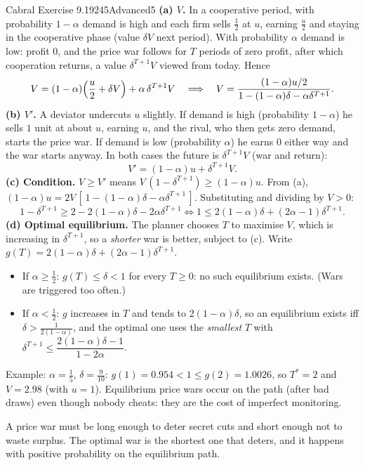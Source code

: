 \begin{exsol}{Cabral Exercise 9.19}{245}{Advanced}{5}
\solution
\textbf{(a) $V$.} In a cooperative period, with probability $1-\alpha$ demand is high and each firm sells
$\frac12$ at $u$, earning $\frac u2$ and staying in the cooperative phase (value $\delta V$ next period). With
probability $\alpha$ demand is low: profit $0$, and the price war follows for $T$ periods of zero profit, after which
cooperation returns, a value $\delta^{T+1}V$ viewed from today. Hence
\[
  V = (1-\alpha)\Bigl(\frac u2 + \delta V\Bigr) + \alpha\,\delta^{T+1}V
  \quad\Longrightarrow\quad
  V = \frac{(1-\alpha)u/2}{1 - (1-\alpha)\delta - \alpha\delta^{T+1}} .
\]
\textbf{(b) $V'$.} A deviator undercuts $u$ slightly. If demand is high (probability $1-\alpha$) he sells $1$ unit at about
$u$, earning $u$, and the rival, who then gets zero demand, starts the price war. If demand is low (probability $\alpha$)
he earns $0$ either way and the war starts anyway. In both cases the future is $\delta^{T+1}V$ (war and return):
\[
  V' = (1-\alpha)u + \delta^{T+1}V .
\]
\textbf{(c) Condition.} $V \ge V'$ means $V\,(1 - \delta^{T+1}) \ge (1-\alpha)u$. From (a), $(1-\alpha)u =
2V\,[\,1 - (1-\alpha)\delta - \alpha\delta^{T+1}\,]$. Substituting and dividing by $V > 0$:
\[
  1 - \delta^{T+1} \ge 2 - 2(1-\alpha)\delta - 2\alpha\delta^{T+1}
  \iff 1 \le 2(1-\alpha)\delta + (2\alpha - 1)\delta^{T+1} .
\]
\textbf{(d) Optimal equilibrium.} The planner chooses $T$ to maximise $V$, which is increasing in $\delta^{T+1}$, so a
\emph{shorter} war is better, subject to (c). Write $g(T) = 2(1-\alpha)\delta + (2\alpha - 1)\delta^{T+1}$.
\begin{itemize}
  \item If $\alpha \ge \frac12$: $g(T) \le \delta < 1$ for every $T \ge 0$: no such equilibrium exists. (Wars are
  triggered too often.)
  \item If $\alpha < \frac12$: $g$ increases in $T$ and tends to $2(1-\alpha)\delta$, so an equilibrium exists iff
  $\delta > \frac{1}{2(1-\alpha)}$, and the optimal one uses the \emph{smallest} $T$ with
  $\delta^{T+1} \le \dfrac{2(1-\alpha)\delta - 1}{1 - 2\alpha}$.
\end{itemize}
Example: $\alpha = \frac15$, $\delta = \frac9{10}$: $g(1) = 0.954 < 1 \le g(2) = 1.0026$, so $T^* = 2$ and $V = 2.98$ (with $u = 1$).
Equilibrium price wars occur on the path (after bad draws) even though nobody cheats: they are the cost of
imperfect monitoring.

\interp A price war must be long enough to deter secret cuts and short enough not to waste surplus. The optimal
war is the shortest one that deters, and it happens with positive probability on the equilibrium path.


\end{exsol}
